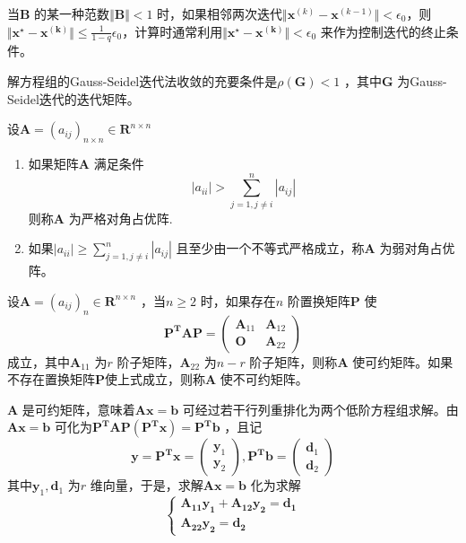 \documentclass[a4paper]{article}
\begin{document}
当$\mathbf{B}$ 的某一种范数$\Vert \mathbf{B} \Vert < 1$ 时，如果相邻两次迭代$\Vert \mathbf{x}^{(k)} - \mathbf{x}^{(k-1)} \Vert < \epsilon_0$，则$\Vert \mathbf{x^{\star} - x^{(k)}} \Vert \le \frac{1}{1-q} \epsilon_0$，计算时通常利用$\Vert \mathbf{x^{\star} - x^{(k)}} \Vert < \epsilon_0$ 来作为控制迭代的终止条件。

\begin{theorem}
	解方程组的Gauss-Seidel迭代法收敛的充要条件是$\rho(\mathbf{G}) < 1$ ，其中$\mathbf{G}$ 为Gauss-Seidel迭代的迭代矩阵。
\end{theorem}

\begin{definition}
	设$\mathbf{A} = (a_{ij})_{n \times n} \in \mathbf{R}^{n \times n}$ 
	\begin{enumerate}
		\item 如果矩阵$\mathbf{A}$ 满足条件
			\[
				|a_{ii} | > \sum_{j=1,j\neq i}^{n} |a_{ij}| \tag{7.3.3} \label{eq:7.3.3} 
			\] 
			则称$\mathbf{A}$ 为严格对角占优阵.
		\item 如果$| a_{ii} | \ge \sum_{j=1, j\neq i}^{n} |a_{ij}|$ 且至少由一个不等式严格成立，称$\mathbf{A}$ 为弱对角占优阵。
	\end{enumerate}
\end{definition}

\begin{definition}
	设$\mathbf{A} = (a_{ij})_n \in \mathbf{R}^{n \times n}$ ，当$n \ge 2$ 时，如果存在$n$ 阶置换矩阵$\mathbf{P}$ 使
	\[
		\tag{7.3.4} \label{eq:7.3.4} 
		\mathbf{P^{T}AP} = \begin{pmatrix} 
			\mathbf{A}_{11} & \mathbf{A}_{12} \\ 
			\mathbf{O} & \mathbf{A}_{22}
		\end{pmatrix}
	\] 
	成立，其中$\mathbf{A}_{11}$ 为$r$ 阶子矩阵，$\mathbf{A}_{22}$ 为$n-r$ 阶子矩阵，则称$\mathbf{A}$ 使可约矩阵。如果不存在置换矩阵$\mathbf{P}$使上式成立，则称$\mathbf{A}$ 使不可约矩阵。
\end{definition}
 
$\mathbf{A}$ 是可约矩阵，意味着$\mathbf{Ax=b}$ 可经过若干行列重排化为两个低阶方程组求解。由$\mathbf{Ax=b}$ 可化为$\mathbf{P^{T}AP(P^{T}x) = P^{T}b}$ ，且记
\[
\mathbf{y} = \mathbf{P^{T}x} = \begin{pmatrix} \mathbf{y}_1 \\ \mathbf{y}_2 \end{pmatrix} ,\mathbf{P^{T}b} = \begin{pmatrix} \mathbf{d}_1 \\ \mathbf{d}_2 \end{pmatrix} 
\] 
其中$\mathbf{y}_1, \mathbf{d}_1$ 为$r$ 维向量，于是，求解$\mathbf{Ax=b}$ 化为求解
\[
\begin{cases}
	\mathbf{A_{11} y_1 + A_{12} y_2 = d_1} \\
	\mathbf{A_{22} y_2 = d_2}
\end{cases} 
\] 
\end{document}
